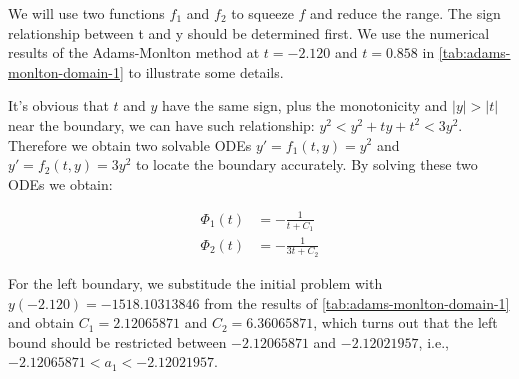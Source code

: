 \documentclass[a4paper]{article}
\begin{document}
	We will use two functions $f_1$ and $f_2$ to squeeze $f$ and reduce the range. The sign relationship between t and y should be determined first. We use the numerical results of the Adams-Monlton method at $t = -2.120$ and $t = 0.858$ in \autoref{tab:adams-monlton-domain-1} to illustrate some details.
	
	\begin{table}[H]
		\centering
		\caption{y of the results of the Adams-Monlton method when t = -2.120 and t = 0.858}
		\label{tab:adams-monlton-domain-1}
	\end{table}
	
	It's obvious that $t$ and $y$ have the same sign, plus the monotonicity and $|y| > |t|$ near the boundary, we can have such relationship: $y^2 < y^2 + ty + t^2 < 3y^2$. Therefore we obtain two solvable ODEs $y' = f_1(t, y) = y^2$ and $y' = f_2(t, y) = 3y^2$ to locate the boundary accurately. By solving these two ODEs we obtain:
	
	\begin{align}
		\Phi_1(t) &= -\frac{1}{t + C_1} \\
		\Phi_2(t) &= -\frac{1}{3t + C_2}
	\end{align}
	
	For the left boundary, we substitude the initial problem with $y(-2.120) = -1518.10313846$ from the results of \autoref{tab:adams-monlton-domain-1} and obtain $C_1 = 2.12065871$ and $C_2 = 6.36065871$, which turns out that the left bound should be restricted between $-2.12065871$ and $-2.12021957$, i.e., $-2.12065871 < a_1 < -2.12021957$.
	
\end{document}
